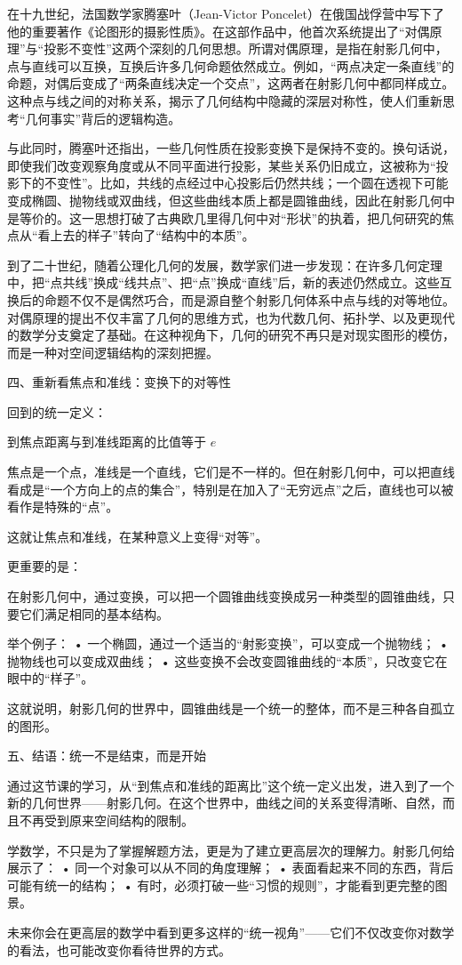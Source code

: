 在十九世纪，法国数学家腾塞叶（Jean-Victor Poncelet）在俄国战俘营中写下了他的重要著作《论图形的摄影性质》。在这部作品中，他首次系统提出了“对偶原理”与“投影不变性”这两个深刻的几何思想。所谓对偶原理，是指在射影几何中，点与直线可以互换，互换后许多几何命题依然成立。例如，“两点决定一条直线”的命题，对偶后变成了“两条直线决定一个交点”，这两者在射影几何中都同样成立。这种点与线之间的对称关系，揭示了几何结构中隐藏的深层对称性，使人们重新思考“几何事实”背后的逻辑构造。

与此同时，腾塞叶还指出，一些几何性质在投影变换下是保持不变的。换句话说，即使我们改变观察角度或从不同平面进行投影，某些关系仍旧成立，这被称为“投影下的不变性”。比如，共线的点经过中心投影后仍然共线；一个圆在透视下可能变成椭圆、抛物线或双曲线，但这些曲线本质上都是圆锥曲线，因此在射影几何中是等价的。这一思想打破了古典欧几里得几何中对“形状”的执着，把几何研究的焦点从“看上去的样子”转向了“结构中的本质”。

到了二十世纪，随着公理化几何的发展，数学家们进一步发现：在许多几何定理中，把“点共线”换成“线共点”、把“点”换成“直线”后，新的表述仍然成立。这些互换后的命题不仅不是偶然巧合，而是源自整个射影几何体系中点与线的对等地位。对偶原理的提出不仅丰富了几何的思维方式，也为代数几何、拓扑学、以及更现代的数学分支奠定了基础。在这种视角下，几何的研究不再只是对现实图形的模仿，而是一种对空间逻辑结构的深刻把握。


四、重新看焦点和准线：变换下的对等性

回到的统一定义：

到焦点距离与到准线距离的比值等于 $e$

焦点是一个点，准线是一个直线，它们是不一样的。但在射影几何中，可以把直线看成是“一个方向上的点的集合”，特别是在加入了“无穷远点”之后，直线也可以被看作是特殊的“点”。

这就让焦点和准线，在某种意义上变得“对等”。

更重要的是：

在射影几何中，通过变换，可以把一个圆锥曲线变换成另一种类型的圆锥曲线，只要它们满足相同的基本结构。

举个例子：
	•	一个椭圆，通过一个适当的“射影变换”，可以变成一个抛物线；
	•	抛物线也可以变成双曲线；
	•	这些变换不会改变圆锥曲线的“本质”，只改变它在眼中的“样子”。

这就说明，射影几何的世界中，圆锥曲线是一个统一的整体，而不是三种各自孤立的图形。

五、结语：统一不是结束，而是开始

通过这节课的学习，从“到焦点和准线的距离比”这个统一定义出发，进入到了一个新的几何世界——射影几何。在这个世界中，曲线之间的关系变得清晰、自然，而且不再受到原来空间结构的限制。

学数学，不只是为了掌握解题方法，更是为了建立更高层次的理解力。射影几何给展示了：
	•	同一个对象可以从不同的角度理解；
	•	表面看起来不同的东西，背后可能有统一的结构；
	•	有时，必须打破一些“习惯的规则”，才能看到更完整的图景。

未来你会在更高层的数学中看到更多这样的“统一视角”——它们不仅改变你对数学的看法，也可能改变你看待世界的方式。
